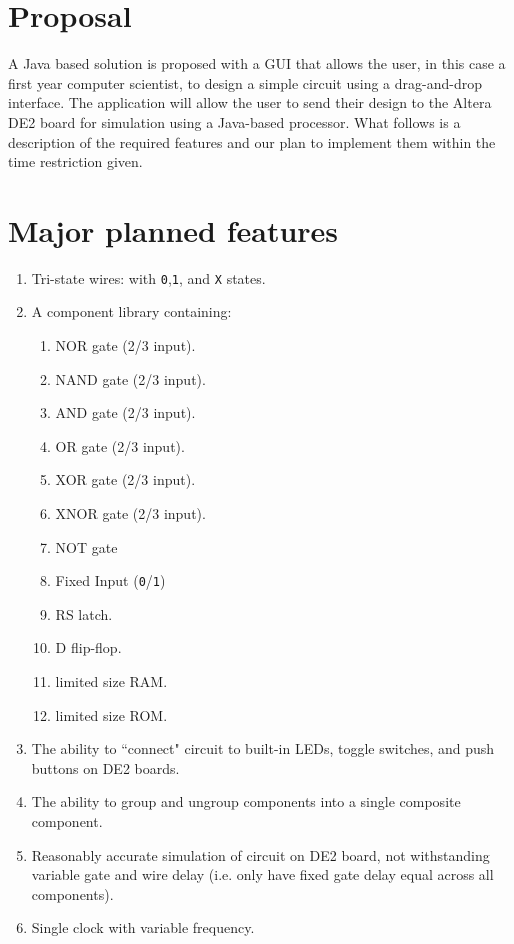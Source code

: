 \documentclass[12pt, a4paper, oneside,titlepage]{article}
\begin{document}
\section{Proposal}
A Java based solution is proposed with a GUI that allows the user, in this case a first year computer scientist, to design a simple circuit using a drag-and-drop interface. The application will allow the user to send their design to the Altera DE2 board for simulation using a Java-based processor.  What follows is a description of the required features and our plan to implement them within the time restriction given.
\section{Major planned features}
 \label{sec:majfeat}
\begin{enumerate}
\item Tri-state wires: with \texttt{0},\texttt{1}, and \texttt{X} states.
\item A component library containing:	 \begin{enumerate}
								\item NOR gate (2/3 input).
								\item NAND gate (2/3 input).
								\item AND gate (2/3 input).
								\item OR gate (2/3 input).
								\item XOR gate (2/3 input).
								\item XNOR gate (2/3 input).
								 \item NOT gate
								 \item Fixed Input (\texttt{0}/\texttt{1})
								\item RS latch.
								\item D flip-flop.
								\item limited size RAM.
								\item limited size ROM.
								\end{enumerate}
\item The ability to ``connect" circuit to built-in LEDs, toggle switches, and push buttons on DE2 boards.
\item The ability to group and ungroup components into a single composite component.
\item Reasonably accurate simulation of circuit on DE2 board, not withstanding variable gate and wire delay (i.e. only have fixed gate delay equal across all components).
\item Single clock with variable frequency.

\end{enumerate}
\end{document}
